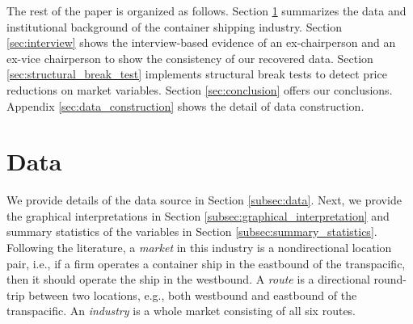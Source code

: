 \documentclass[11pt]{article}
\begin{document}
The rest of the paper is organized as follows. Section \ref{sec:data} summarizes the data and institutional background of the container shipping industry. Section \ref{sec:interview} shows the interview-based evidence of an ex-chairperson and an ex-vice chairperson to show the consistency of our recovered data. Section \ref{sec:structural_break_test} implements structural break tests to detect price reductions on market variables. Section \ref{sec:conclusion} offers our conclusions. Appendix \ref{sec:data_construction} shows the detail of data construction.

\section{Data}\label{sec:data}

We provide details of the data source in Section \ref{subsec:data}. Next, we provide the graphical interpretations in Section \ref{subsec:graphical_interpretation} and summary statistics of the variables in Section \ref{subsec:summary_statistics}. Following the literature, a \textit{market} in this industry is a nondirectional location pair, i.e., if a firm operates a container ship in the eastbound of the transpacific, then it should operate the ship in the westbound. A \textit{route} is a directional round-trip between two locations, e.g., both westbound and eastbound of the transpacific. An \textit{industry} is a whole market consisting of all six routes.
\end{document}
